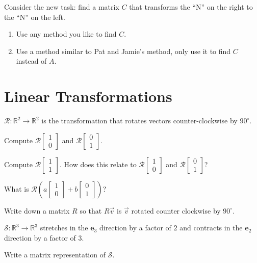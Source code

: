 \documentclass[14pt]{problemset}
\newcommand{\yh}{{{\mathbf e}_2}}
\newcommand{\zh}{{{\mathbf e}_3}}
\newcommand{\R}{\mathbb{R}}
\newcommand{\mat}[1]{\begin{bmatrix}#1\end{bmatrix}}
\begin{document}
Consider the new task: find a matrix $C$ that transforms the ``N'' on the right to
the ``N'' on the left.
\begin{enumerate}
	\item Use any method you like to find $C$.
	\item Use a method similar to Pat and Jamie's method, only use it to find $C$ instead
		of $A$.
\end{enumerate}















\newpage
\pagestyle{siefken}


\section*{Linear Transformations}
\vspace{-1.5em}
	
	\question
	$\mathcal R:\R^2\to\R^2$ is the transformation that rotates vectors counter-clockwise 
	by $90^\circ$.
	\begin{parts}
		\item Compute $\mathcal R\mat{1\\0}$ and $\mathcal R\mat{0\\1}$.
		\item Compute $\mathcal R\mat{1\\1}$.  How does this relate to
			$\mathcal R\mat{1\\0}$ and $\mathcal R\mat{0\\1}$?
		\item What is $\mathcal R\left(a\mat{1\\0}+b\mat{0\\1}\right)$?
		\item Write down a matrix $R$ so that $R\vec v$ is $\vec v$ rotated
			counter clockwise by $90^\circ$.
	\end{parts}

	\question
	$\mathcal S:\R^3\to\R^3$ stretches in the $\zh$ direction  by a factor of $2$
	and contracts in the $\yh$ direction by a factor of $3$.
	\begin{parts}
		\item Write a matrix representation of $\mathcal S$.
	\end{parts}
\end{document}

